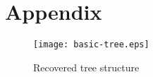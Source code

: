 \documentclass{article}
\begin{document}
{\small


}


\section*{Appendix}
\label{appendix}
\begin{figure}[ht]
\begin{center}

\texttt{[image: basic-tree.eps]}

\end{center}

\caption{Recovered tree structure}

\end{figure}
\end{document}
